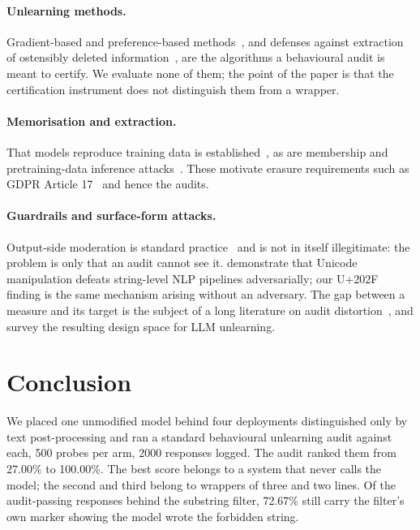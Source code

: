 \documentclass[journal]{IEEEtran}
\providecommand{\citet}[1]{\cite{#1}}
\theoremstyle{definition}
\newcommand{\Nrows}{2000}
\newcommand{\Nper}{500}
\newcommand{\NoneRate}{27.00}
\newcommand{\PfRate}{100.00}
\newcommand{\RedactPassingPc}{72.67}
\begin{document}
\paragraph{Unlearning methods.} Gradient-based and preference-based
methods~\cite{zhang2024npo,kurmanji2023towards,eldan2023harry}, and defenses
against extraction of ostensibly deleted information~\cite{patil2024sensitive},
are the algorithms a behavioural audit is meant to certify. We evaluate none of
them; the point of the paper is that the certification instrument does not
distinguish them from a wrapper.

\paragraph{Memorisation and extraction.} That models reproduce training data is
established~\cite{carlini2021extracting,carlini2023quantifying,nasr2023scalable},
as are membership and pretraining-data inference
attacks~\cite{shokri2017membership,shi2024minkpc}. These motivate erasure
requirements such as GDPR Article 17~\cite{gdpr2016} and hence the audits.

\paragraph{Guardrails and surface-form attacks.} Output-side moderation is
standard practice~\cite{inan2023llamaguard,markov2023holistic} and is not in
itself illegitimate: the problem is only that an audit cannot see it.
\citet{boucher2022bad} demonstrate that Unicode manipulation defeats string-level
NLP pipelines adversarially; our U+202F finding is the same mechanism arising
without an adversary. The gap between a measure and its target is the subject of
a long literature on audit
distortion~\cite{strathern1997improving,manheim2018categorizing}, and
\citet{liu2024rethinking} survey the resulting design space for LLM unlearning.

\section{Conclusion}

We placed one unmodified model behind four deployments distinguished only by text
post-processing and ran a standard behavioural unlearning audit against each,
\Nper{} probes per arm, \Nrows{} responses logged. The audit ranked them from
\NoneRate\% to \PfRate\%. The best score belongs to a system that never calls the
model; the second and third belong to wrappers of three and two lines. Of the
audit-passing responses behind the substring filter, \RedactPassingPc\% still
carry the filter's own marker showing the model wrote the forbidden string.
\end{document}
